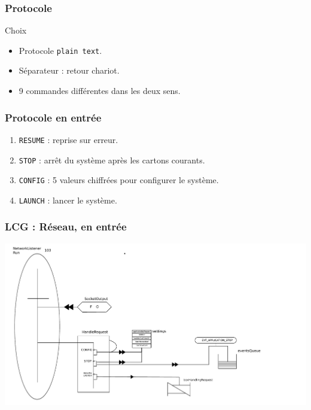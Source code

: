 \documentclass{beamer}
\begin{document}
	\begin{frame}

	\frametitle{Protocole}

	    \begin{block}{Choix}

	  \begin{itemize}

	      \item Protocole \texttt{plain text}.

	      \item Séparateur : retour chariot.

	      \item 9 commandes différentes dans les deux sens.

	  \end{itemize}

	    \end{block}

	\end{frame}

	

	\begin{frame}

	\frametitle{Protocole en entrée}

	\begin{enumerate}

	    \item \texttt{RESUME} : reprise sur erreur.

	    \item \texttt{STOP} : arrêt du système après les cartons courants.

	    \item \texttt{CONFIG} : 5 valeurs chiffrées pour configurer le système.

	    \item \texttt{LAUNCH} : lancer le système.

	\end{enumerate}

	\end{frame}

	

	\begin{frame}

	    \frametitle{LCG : Réseau, en entrée}

	    \includegraphics[width=\textwidth]{../SchemasLCG/NetworkListener-run.pdf}

	\end{frame}
\end{document}
